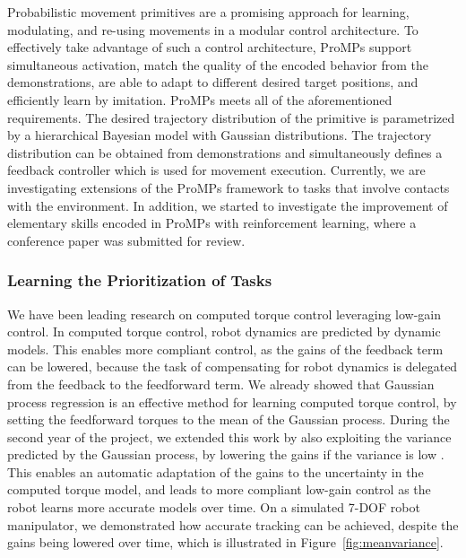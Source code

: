 \documentclass[final,5p,twocolumn]{elsarticle}
\begin{document}
Probabilistic movement primitives are a promising approach for learning,
modulating, and re-using movements in a modular control architecture.  To
effectively take advantage of such a control architecture, ProMPs support
simultaneous activation, match the quality of the encoded behavior from the
demonstrations, are able to adapt to different desired target positions, and
efficiently learn by imitation. ProMPs meets all of the aforementioned
requirements.  The desired trajectory distribution of the
primitive is parametrized by a hierarchical Bayesian model with Gaussian distributions. The
trajectory distribution can be obtained from demonstrations and 
simultaneously defines a feedback controller which is used for movement
execution. Currently, we are investigating extensions of the ProMPs framework 
to tasks that involve 
contacts with the environment. In addition, we started to investigate the improvement of elementary skills encoded in ProMPs with 
reinforcement learning, where a conference paper was submitted for review.


\subsubsection{Learning the Prioritization of Tasks}

We have been leading research on computed torque control leveraging low-gain control. 
In computed torque control, robot dynamics are predicted by dynamic models.
This enables more compliant control, as the gains of the feedback term can be
lowered, because the task of compensating for robot dynamics is delegated from
the feedback to the feedforward term.  We already showed that Gaussian process
regression is an effective method for learning computed torque control, by
setting the feedforward torques to the mean of the Gaussian process.  During
the second year of the project, we extended this work by also exploiting the
variance predicted by the Gaussian process, by lowering the gains if the
variance is low \cite{Albertoetal14}.  This enables an automatic adaptation of
the gains to the uncertainty in the computed torque model, and leads to more
compliant low-gain control as the robot learns more accurate models over time.
On a simulated 7-DOF robot manipulator, we demonstrated how accurate tracking
can be achieved, despite the gains being lowered over time, which is illustrated in Figure~\ref{fig:meanvariance}.\\
\end{document}
